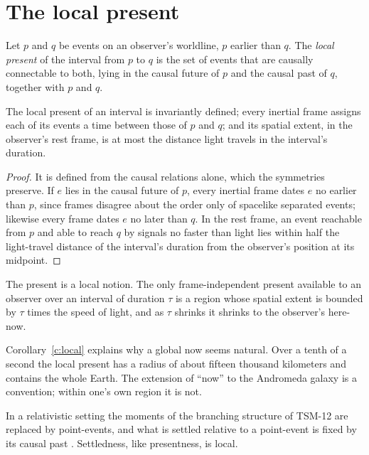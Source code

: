 \documentclass{situationist-preprint}
\begin{document}
\section{The local present}

\begin{definition}\label{d:local}
Let $p$ and $q$ be events on an observer's worldline, $p$ earlier than $q$. The \emph{local present} of the interval from $p$ to $q$ is the set of events that are causally connectable to both, lying in the causal future of $p$ and the causal past of $q$, together with $p$ and $q$.
\end{definition}

\begin{proposition}\label{p:local}
The local present of an interval is invariantly defined; every inertial frame assigns each of its events a time between those of $p$ and $q$; and its spatial extent, in the observer's rest frame, is at most the distance light travels in the interval's duration.
\end{proposition}

\begin{proof}
It is defined from the causal relations alone, which the symmetries preserve. If $e$ lies in the causal future of $p$, every inertial frame dates $e$ no earlier than $p$, since frames disagree about the order only of spacelike separated events; likewise every frame dates $e$ no later than $q$. In the rest frame, an event reachable from $p$ and able to reach $q$ by signals no faster than light lies within half the light-travel distance of the interval's duration from the observer's position at its midpoint.
\end{proof}

\begin{corollary}\label{c:local}
The present is a local notion. The only frame-independent present available to an observer over an interval of duration $\tau$ is a region whose spatial extent is bounded by $\tau$ times the speed of light, and as $\tau$ shrinks it shrinks to the observer's here-now.
\end{corollary}

Corollary~\ref{c:local} explains why a global now seems natural. Over a tenth of a second the local present has a radius of about fifteen thousand kilometers and contains the whole Earth. The extension of \enquote{now} to the Andromeda galaxy is a convention; within one's own region it is not.

In a relativistic setting the moments of the branching structure of TSM-12 are replaced by point-events, and what is settled relative to a point-event is fixed by its causal past \citep{Stein1991,Belnap1992}. Settledness, like presentness, is local.
\end{document}
